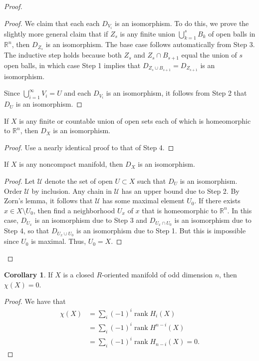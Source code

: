 \documentclass[10pt,letterpaper,cm]{nupset}
\theoremstyle{definition}
\theoremstyle{theorem}
\newtheorem{corollary}[definition]{Corollary}
\theoremstyle{remark}
\newcommand{\R}{\mathbb{R}}
\newcommand{\1}{\mathbb{1}}
\newcommand{\0}{\vec 0}
\DeclareMathOperator{\rnk}{rank}
\begin{document}
\begin{proof}
\begin{steps}
\begin{proof}
We claim that each each $D_{V_i}$ is an isomorphism. To do this, we prove the slightly more general claim that if $Z_s$ is any finite union $\bigcup_{k=1}^s B_k$ of open balls in $\R^n$, then $D_{Z_s}$ is an isomorphism. The base case follows automatically from Step 3. The inductive step holds because both $Z_s$ and $Z_s\cap B_{s+1}$ equal the union of $s$ open balls, in which case Step 1 implies that $ D_{Z_s \cup B_{s+1}} = D_{Z_{s+1}}$ is an isomorphism.

Since $\bigcup_{i=1}^{\infty} V_i = U$ and each $D_{V_i}$ is an isomorphism, it follows from Step 2 that $D_U$ is an isomorphism.
\end{proof}
\item If $X$ is any finite or countable union of open sets each of which is homeomorphic to $\R^n$, then $D_X$ is an isomorphism.
\begin{proof}
Use a nearly identical proof to that of Step 4.
\end{proof}
\item If $X$ is any noncompact manifold, then $D_X$ is an isomorphism.
\begin{proof}
Let $\mathcal{U}$ denote the set of open $U\subset X$ such that $D_U$ is an isomorphism. Order $\mathcal{U}$ by inclusion. Any chain in $\mathcal{U}$  has an upper bound due to Step 2. By Zorn's lemma, it follows that $\mathcal{U}$  has  some maximal element $U_0$. If there exists $x\in X \setminus U_0$, then find a neighborhood $U_x$ of $x$ that is homeomorphic to $\R^n$. In this case, $D_{U_x}$ is an isomorphism due to Step 3 and $D_{U_x \cap U_0}$ is an isomorphism due to Step 4, so that $D_{U_x \cup U_0}$ is an isomorphism due to Step 1. But this is impossible since $U_0$ is maximal. Thus, $U_0 = X$.
\end{proof}
\end{steps}
\end{proof}

\begin{corollary}
If $X$ is a closed $R$-oriented manifold of odd dimension $n$, then $\chi(X) =0$.
\end{corollary}
\begin{proof}
We have that \begin{align*} \chi(X) &= \sum_i({-}1)^i\rnk{H_i(X)} \\ & = \sum_i({-}1)^i\rnk{H^{n-i}(X)} \\ &= \sum_i({-}1)^i\rnk{H_{n-i}(X)} =0.\end{align*}
\end{proof}
\end{document}
